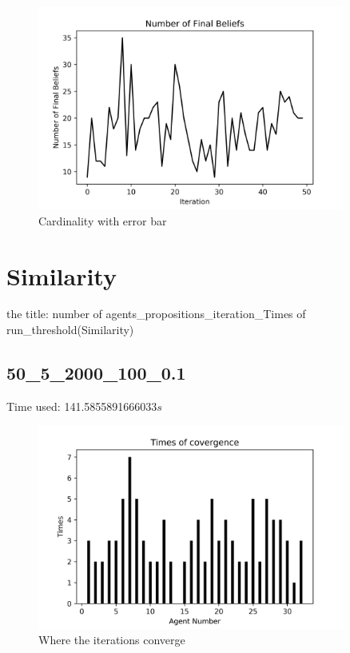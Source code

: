 \documentclass[a4paper,12pt]{article}
\begin{document}
\begin{figure}[H]
	\centering
	\includegraphics[width=0.9\textwidth]{numbef50_4_1500_50_8}
	\caption{Cardinality with error bar}\label{numbef50_4_1500_50_8_mh}
\end{figure}


\section{Similarity}
the title: number of agents\_propositions\_iteration\_Times of run\_threshold(Similarity)
\graphicspath{{figsSimlarity/}}

\subsection{50\_5\_2000\_100\_0.1}
Time used: 141.5855891666033${s}$
\begin{figure}[H]
	\centering
	\includegraphics[width=0.9\textwidth]{agt50_5_2000_100_1}
	\caption{Where the iterations converge}\label{agt50_5_2000_100_1s}
\end{figure}
\end{document}
